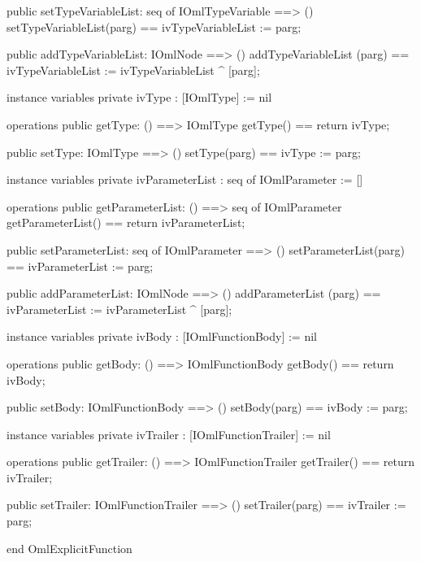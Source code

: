 \begin{vdm_al}
  public setTypeVariableList: seq of IOmlTypeVariable ==> ()
  setTypeVariableList(parg) == ivTypeVariableList := parg;

  public addTypeVariableList: IOmlNode ==> ()
  addTypeVariableList (parg) == ivTypeVariableList := ivTypeVariableList ^ [parg];

instance variables
  private ivType : [IOmlType] := nil

operations
  public getType: () ==> IOmlType
  getType() == return ivType;

  public setType: IOmlType ==> ()
  setType(parg) == ivType := parg;

instance variables
  private ivParameterList : seq of IOmlParameter := []

operations
  public getParameterList: () ==> seq of IOmlParameter
  getParameterList() == return ivParameterList;

  public setParameterList: seq of IOmlParameter ==> ()
  setParameterList(parg) == ivParameterList := parg;

  public addParameterList: IOmlNode ==> ()
  addParameterList (parg) == ivParameterList := ivParameterList ^ [parg];

instance variables
  private ivBody : [IOmlFunctionBody] := nil

operations
  public getBody: () ==> IOmlFunctionBody
  getBody() == return ivBody;

  public setBody: IOmlFunctionBody ==> ()
  setBody(parg) == ivBody := parg;

instance variables
  private ivTrailer : [IOmlFunctionTrailer] := nil

operations
  public getTrailer: () ==> IOmlFunctionTrailer
  getTrailer() == return ivTrailer;

  public setTrailer: IOmlFunctionTrailer ==> ()
  setTrailer(parg) == ivTrailer := parg;

end OmlExplicitFunction
\end{vdm_al}

